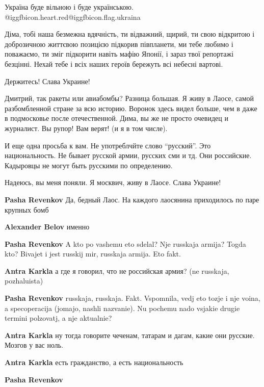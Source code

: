\begin{itemize}
Україна буде вільною і буде українською. @igg{fbicon.heart.red}@igg{fbicon.flag.ukraina}


Діма, тобі наша безмежна вдячність, ти відважний, щирий, ти свою відкритою і
доброзичною життєвою позицією підкорив півпланети, ми тебе любимо і поважаємо,
ти зміг підкорити навіть мафію Японії, і зараз твої репортажі безцінні. Нехай
тебе і всіх наших героїв бережуть всі небесні вартові.

Держитесь! Слава Украине!


Дмитрий, так ракеты или авиабомбы? Разница большая. Я живу в Лаосе, самой
разбомбленной стране за всю историю. Воронок здесь видел больше, чем в даже в
подмосковье после отечественной. Дима, вы же не просто очевидец и журналист. Вы
рупор! Вам верят! (и я в том числе).

И еще одна просьба к вам. Не употреблчйте слово \enquote{русский}. Это
национальность.  Не бывает русской армии, русских сми и тд. Они российские.
Кадыровцы не могут быть русскими по определению.

Надеюсь, вы меня поняли. Я москвич, живу в Лаосе. Слава Украине!

\begin{itemize} %
\textbf{Pasha Revenkov}
Да, бедный Лаос. На каждого лаосянина приходилось по паре крупных бомб

\textbf{Alexander Belov} именно

\textbf{Pasha Revenkov} A kto po vashemu eto sdelal? Nje russkaja armija? Togda kto? Bivajet i jest russkij mir, russkaja armija. Eto fakt.

\textbf{Antra Karkla} а где я говорил, что не российская армия? (ne russkaja, pozhaluista)

\textbf{Pasha Revenkov} russkaja, russkaja. Fakt. Vspomnila, vedj eto tozje i nje voina, a specoperacija (jomajo, nashli nazvanie). Nu pochemu nado vsjakie drugie termini polzovatj, a nje aktualnie?

\textbf{Antra Karkla} ну тогда говорите чеченам, татарам и дагам, какие они русские. Мозгов у вас ноль.

\textbf{Antra Karkla} есть гражданство, а есть национальность

\textbf{Pasha Revenkov} 


\end{itemize}
\end{itemize}
